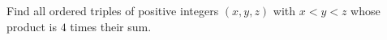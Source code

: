 Find all ordered triples of positive integers $(x,y,z)$ with $x<y<z$ whose product is $4$ times their sum.
